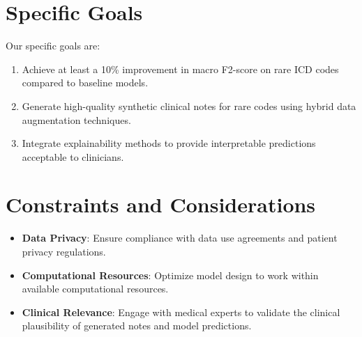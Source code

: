 \section{Specific Goals}
Our specific goals are:
\begin{enumerate}
    \item Achieve at least a 10\% improvement in macro F2-score on rare ICD codes compared to baseline models.
    \item Generate high-quality synthetic clinical notes for rare codes using hybrid data augmentation techniques.
    \item Integrate explainability methods to provide interpretable predictions acceptable to clinicians.
\end{enumerate}

\section{Constraints and Considerations}
\begin{itemize}
    \item \textbf{Data Privacy}: Ensure compliance with data use agreements and patient privacy regulations.
    \item \textbf{Computational Resources}: Optimize model design to work within available computational resources.
    \item \textbf{Clinical Relevance}: Engage with medical experts to validate the clinical plausibility of generated notes and model predictions.
\end{itemize}
